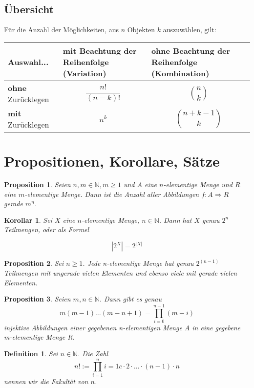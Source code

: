 \documentclass[12pt, twoside]{article}
\newcommand{\N}{\mathbb{N}}
\newtheorem{Kor}{Korollar}[subsection]
\newtheorem{Prop}{Proposition}[subsection]
\newtheorem{Def}{Definition}[subsection]
\begin{document}
\subsection{Übersicht}
Für die Anzahl der Möglichkeiten, aus $n$ Objekten $k$ auszuwählen, gilt: \\


\begin{centering}
\begin{tabular}{l|p{4.5cm}|p{4.5cm}}
Auswahl... & \textbf{mit} Beachtung der Reihenfolge (Variation) & \textbf{ohne} Beachtung der Reihenfolge (Kombination) \\
\hline
\hline
\textbf{ohne} Zurücklegen &  $$\frac{n!}{(n-k)!}$$  & $$\binom{n}{k}$$  \\
\hline
\textbf{mit} Zurücklegen & $$n^k$$ & $$\binom{n+k-1}{k}$$ \\

\end{tabular}
\end{centering}


\section{Propositionen, Korollare, Sätze}
\begin{Prop} Seien $n, m \in \N, m \ge 1$ und $A$ eine $n$-elementige Menge und $R$ eine $m$-elementige Menge. Dann ist die 
Anzahl aller Abbildungen $f:A \Rightarrow R$ gerade $m^n$.
\end{Prop}
\begin{Kor} 
Sei $X$ eine $n$-elementige Menge, $n \in \N$. Dann hat $X$ genau $2^n$ Teilmengen, oder als Formel
\end{Kor}
$$|2^X|=2^{|X|}$$





\begin{Prop} Sei  $n \ge 1$. Jede n-elementige Menge hat genau $2^{(n-1)}$ Teilmengen mit ungerade vielen Elementen und 
ebenso viele mit gerade vielen Elementen. 
\end{Prop}

\begin{Prop} Seien $m, n \in \N $. Dann gibt es genau 
$$
m(m-1)\dots (m-n+1)= \prod_{i=0}^{n-1} (m-i)
$$
injektive Abbildungen einer gegebenen n-elementigen Menge A in eine gegebene m-elementige Menge R.
\end{Prop}

\begin{Def} Sei $n \in \N$. Die Zahl
$$
n!:= \prod_{i=1}^{n}i=1c\cdot 2 \cdot \ldots \cdot(n-1)\cdot n
$$
nennen wir die Fakultät von $n$.
\end{Def}
\end{document}

